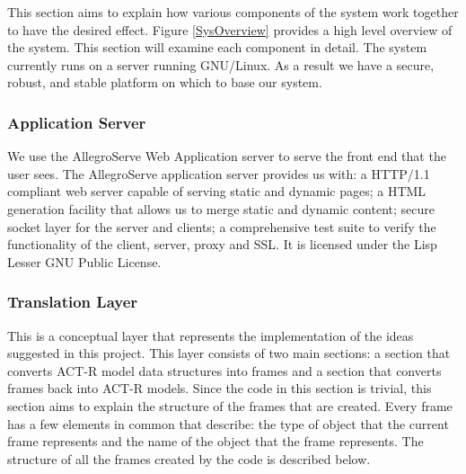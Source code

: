 This section aims to explain how various components of the system work
together to have the desired effect. Figure \ref{SysOverview} provides
a high level overview of the system.  This section will examine each
component in detail.  The system currently runs on a server running
GNU\slash Linux.  As a result we have a secure, robust, and stable
platform on which to base our system.


\subsubsection{Application Server}

We use the AllegroServe Web Application server to serve the front end
that the user sees. The AllegroServe\cite{aserve2009} application server provides us
with: a HTTP/1.1 compliant web server capable of serving static and
dynamic pages; a HTML generation facility that allows us to merge
static and dynamic content; secure socket layer for the server and
clients; a comprehensive test suite to verify the functionality of the
client, server, proxy and SSL. It is licensed under the Lisp Lesser
GNU Public License. 




\subsubsection{Translation Layer}

This is a conceptual layer that represents the implementation of the
ideas suggested in this project. This layer consists of two main
sections: a section that converts ACT-R model data structures into
frames and a section that converts frames back into ACT-R
models. Since the code in this section is trivial, this section aims
to explain the structure of the frames that are created. Every frame
has a few elements in common that describe: the type of object that the
current frame represents and the name of the object that the frame
represents. The structure of all the frames created by the code is
described below.

